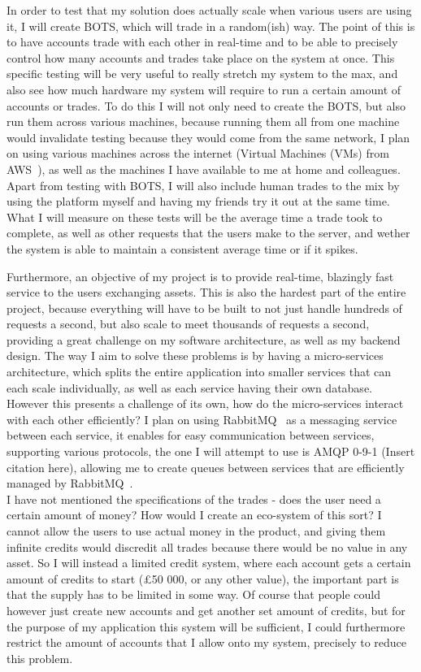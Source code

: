 \documentclass[titlepage]{article}
\begin{document}
\noindent
In order to test that my solution does actually scale when various users are using it, I will create BOTS, which will trade in a random(ish) way. The point of this is to have accounts trade with each other in real-time and to be able to precisely control how many accounts and trades take place on the system at once. This specific testing will be very useful to really stretch my system to the max, and also see how much hardware my system will require to run a certain amount of accounts or trades. To do this I will not only need to create the BOTS, but also run them across various machines, because running them all from one machine would invalidate testing because they would come from the same network, I plan on using various machines across the internet (Virtual Machines (VMs) from AWS~\cite{aws}), as well as the machines I have available to me at home and colleagues. Apart from testing with BOTS, I will also include human trades to the mix by using the platform myself and having my friends try it out at the same time. What I will measure on these tests will be the average time a trade took to complete, as well as other requests that the users make to the server, and wether the system is able to maintain a consistent average time or if it spikes.

\noindent
Furthermore, an objective of my project is to provide real-time, blazingly fast service to the users exchanging assets. This is also the hardest part of the entire project, because everything will have to be built to not just handle hundreds of requests a second, but also scale to meet thousands of requests a second, providing a great challenge on my software architecture, as well as my backend design. The way I aim to solve these problems is by having a micro-services architecture, which splits the entire application into smaller services that can each scale individually, as well as each service having their own database. However this presents a challenge of its own, how do the micro-services interact with each other efficiently? I plan on using RabbitMQ~\cite{rabbitmq} as a messaging service between each service, it enables for easy communication between services, supporting various protocols, the one I will attempt to use is AMQP 0-9-1 (Insert citation here), allowing me to create queues between services that are efficiently managed by RabbitMQ~\cite{rabbitmq}. \\

\noindent
I have not mentioned the specifications of the trades - does the user need a certain amount of money? How would I create an eco-system of this sort? I cannot allow the users to use actual money in the product, and giving them infinite credits would discredit all trades because there would be no value in any asset. So I will instead a limited credit system, where each account gets a certain amount of credits to start (£50 000, or any other value), the important part is that the supply has to be limited in some way. Of course that people could however just create new accounts and get another set amount of credits, but for the purpose of my application this system will be sufficient, I could furthermore restrict the amount of accounts that I allow onto my system, precisely to reduce this problem. \\
\end{document}

